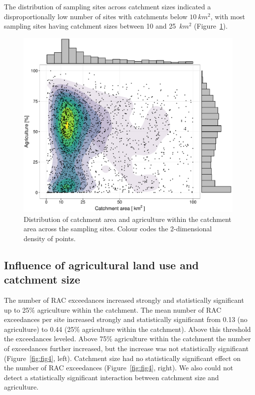 \documentclass[journal=esthag,manuscript=article]{achemso}
\begin{document}
The distribution of sampling sites across catchment sizes indicated a disproportionally low number of sites with catchments below $10~km^2$, with
most sampling sites having catchment sizes between 10 and 25~$km^2$ (Figure~\ref{fig:fig3}). 


\begin{figure}[ht]
  \includegraphics[width=.8\textwidth]{figure3.pdf}
  \caption{Distribution of catchment area and agriculture within the catchment area across the sampling sites.
  Colour codes the 2-dimensional density of points.}
  \label{fig:fig3}
\end{figure}


\subsection{Influence of agricultural land use and catchment size}
The number of RAC exceedances increased strongly and statistically significant up to 25\% agriculture within the catchment.
The mean number of RAC exceedances per site increased strongly and statistically significant from 0.13 (no agriculture) to 0.44 (25\% agriculture within the catchment). 
Above this threshold the exceedances leveled.
Above 75\% agriculture within the catchment the number of exceedances further increased, but the increase was not statistically significant (Figure~\ref{fig:fig4}, left). 
Catchment size had no statistically significant effect on the number of RAC exceedances (Figure~\ref{fig:fig4}, right).
We also could not detect a statistically significant interaction between catchment size and agriculture. 
\end{document}

